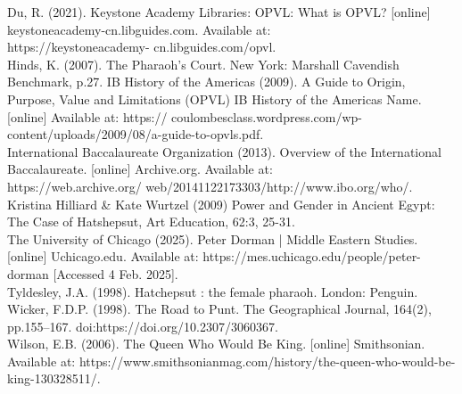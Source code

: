 \documentclass[12pt, letterpaper]{article}
\begin{document}
Du, R. (2021). Keystone Academy Libraries: OPVL: What is OPVL? [online]
keystoneacademy-cn.libguides.com. Available at: \\ https://keystoneacademy-
cn.libguides.com/opvl. \\

Hinds, K. (2007). The Pharaoh’s Court. New York: Marshall Cavendish Benchmark, p.27.
IB History of the Americas (2009). A Guide to Origin, Purpose, Value and Limitations
(OPVL) IB History of the Americas Name. [online] Available at: https://
coulombesclass.wordpress.com/wp-content/uploads/2009/08/a-guide-to-opvls.pdf. \\

International Baccalaureate Organization (2013). Overview of the International
Baccalaureate. [online] Archive.org. Available at: \\ https://web.archive.org/
web/20141122173303/http://www.ibo.org/who/. \\

Kristina Hilliard \& Kate Wurtzel (2009) Power and Gender in Ancient Egypt: The Case of Hatshepsut, Art Education, 62:3, 25-31. \\

The University of Chicago (2025). Peter Dorman | Middle Eastern Studies. [online]
Uchicago.edu. Available at: https://mes.uchicago.edu/people/peter-dorman [Accessed 4
Feb. 2025]. \\

Tyldesley, J.A. (1998). Hatchepsut : the female pharaoh. London: Penguin.
Wicker, F.D.P. (1998). The Road to Punt. The Geographical Journal, 164(2), pp.155–167. doi:https://doi.org/10.2307/3060367. \\

Wilson, E.B. (2006). The Queen Who Would Be King. [online] Smithsonian. Available at:
https://www.smithsonianmag.com/history/the-queen-who-would-be-king-130328511/.
\end{document}
